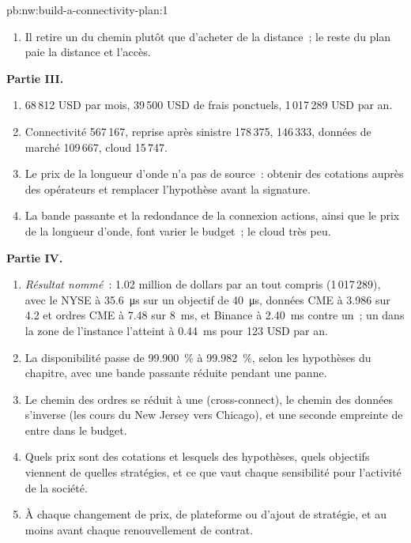 \begin{solution}{pb:nw:build-a-connectivity-plan:1}
\begin{enumerate}[resume]
\item Il retire un  du chemin plutôt que d'acheter de la distance~; le reste du plan paie la distance et l'accès.
\end{enumerate}
\textbf{Partie III.}
\begin{enumerate}[resume]
\item 68\,812 USD par mois, 39\,500 USD de frais ponctuels, 1\,017\,289 USD par an.
\item Connectivité 567\,167, reprise après sinistre 178\,375,  146\,333, données de marché 109\,667, cloud 15\,747.
\item Le prix de la longueur d'onde n'a pas de source~: obtenir des cotations auprès des opérateurs et remplacer l'hypothèse avant la signature.
\item La bande passante et la redondance de la connexion actions, ainsi que le prix de la longueur d'onde, font varier le budget~; le cloud très peu.
\end{enumerate}
\textbf{Partie IV.}
\begin{enumerate}[resume]
\item \emph{Résultat nommé}~: 1.02 million de dollars par an tout compris (1\,017\,289), avec le NYSE à \qty{35.6}{\micro\second} sur un
  objectif de \qty{40}{\micro\second}, données CME à 3.986 sur 4.2 et ordres CME à 7.48 sur \qty{8}{\milli\second}, et Binance à
  \qty{2.40}{\milli\second} contre un~; un  dans la zone de l'instance l'atteint à \qty{0.44}{\milli\second} pour 123 USD par an.
\item La disponibilité passe de 99.900~\% à 99.982~\%, selon les hypothèses du chapitre, avec une bande passante réduite pendant une panne.
\item Le chemin des ordres se réduit à une  (cross-connect), le chemin des données s'inverse (les cours du New Jersey vers Chicago), et une seconde
  empreinte de  entre dans le budget.
\item Quels prix sont des cotations et lesquels des hypothèses, quels objectifs viennent de quelles stratégies, et ce que vaut chaque sensibilité pour
  l'activité de la société.
\item À chaque changement de prix, de plateforme ou d'ajout de stratégie, et au moins avant chaque renouvellement de contrat.

\end{enumerate}
\end{solution}
